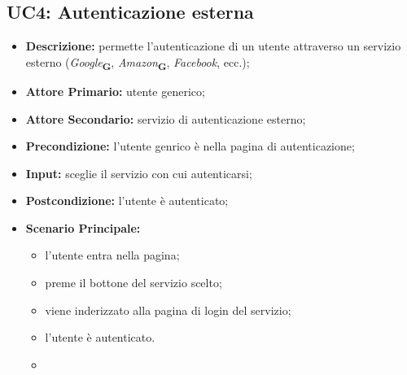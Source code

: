 \subsection{UC4: Autenticazione esterna}
        \label{sec:UC4}
        \begin{itemize}
            \item \textbf{Descrizione:} permette l'autenticazione di un utente attraverso un servizio esterno (\textit{Google}\textsubscript{\textbf{G}}, \textit{Amazon}\textsubscript{\textbf{G}}, \textit{Facebook}, ecc.);
            \item \textbf{Attore Primario:} utente generico;
            \item \textbf{Attore Secondario:} servizio di autenticazione esterno;
            \item \textbf{Precondizione:} l'utente genrico è nella pagina di autenticazione;
            \item \textbf{Input:} sceglie il servizio con cui autenticarsi;
            \item \textbf{Postcondizione:} l'utente è autenticato;
            \item \textbf{Scenario Principale:} 
            \begin{itemize}
                \item l'utente entra nella pagina;
                \item preme il bottone del servizio scelto;
                \item viene inderizzato alla pagina di login del servizio;
                \item l'utente è autenticato.
                \item 
            \end{itemize}
        \end{itemize}